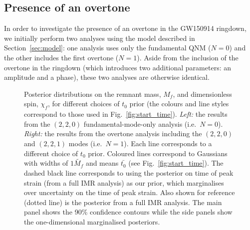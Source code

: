\subsection{Presence of an overtone}\label{subsec:overtone}

In order to investigate the presence of an overtone in the GW150914 ringdown, we initially perform two analyses using the model described in Section~\ref{sec:model}: one analysis uses only the fundamental QNM ($N=0$) and the other includes the first overtone ($N=1$).
Aside from the inclusion of the overtone in the ringdown (which introduces two additional parameters: an amplitude and a phase), these two analyses are otherwise identical.

\begin{figure}[t]
    \captionsetup[subfigure]{labelformat=empty}
    \centering
    \;
    \;
    \caption[Posteriors on the GW150914 remnant mass and spin for each choice of ringdown start-time prior]{  
    Posterior distributions on the remnant mass, $M_f$, and dimensionless spin, $\chi_f$, for different choices of $t_0$ prior (the colours and line styles correspond to those used in Fig.~\ref{fig:start_time}). 
    \emph{Left:} the results from the $(2,2,0)$ fundamental-mode-only analysis (i.e.\ $N=0$).
    \emph{Right:} the results from the overtone analysis including the $(2,2,0)$ and $(2,2,1)$ modes (i.e.\ $N=1$).
    Each line corresponds to a different choice of $t_0$ prior. 
    Coloured lines correspond to Gaussians with widths of $1 \tilde{M_f}$ and means $\bar{t_0}$ (see Fig.~\ref{fig:start_time}).
    The dashed black line corresponds to using the posterior on time of peak strain (from a full IMR analysis) as our prior, which marginalises over uncertainty on the time of peak strain.
    Also shown for reference (dotted line) is the posterior from a full IMR analysis. 
    The main panel shows the 90\% confidence contours while the side panels show the one-dimensional marginalised posteriors.
    }
    \label{fig:mass_spin_post}
\end{figure}

